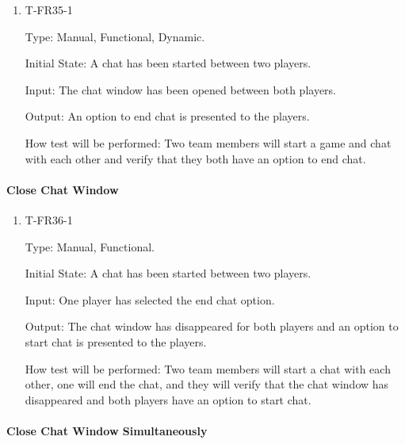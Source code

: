 \documentclass[12pt, titlepage]{article}
\begin{document}
        \begin{enumerate}

        \item{T-FR35-1\\}

            Type: Manual, Functional, Dynamic.
            					
            Initial State: A chat has been started between two players.
            					
            Input: The chat window has been opened between both players.
            					
            Output: An option to end chat is presented to the players.

            How test will be performed: Two team members will start a game and chat with each other and verify that they both have an option to end chat.

        \end{enumerate}
    
    \paragraph{Close Chat Window}

        \begin{enumerate}

        \item{T-FR36-1\\}

            Type: Manual, Functional.
            					
            Initial State: A chat has been started between two players.
            					
            Input: One player has selected the end chat option.
            					
            Output: The chat window has disappeared for both players and an option to start chat is presented to the players.

            How test will be performed: Two team members will start a chat with each other, one will end the chat, and they will verify that the chat window has disappeared and both players have an option to start chat.

        \end{enumerate}
        
    \paragraph{Close Chat Window Simultaneously}
\end{document}
